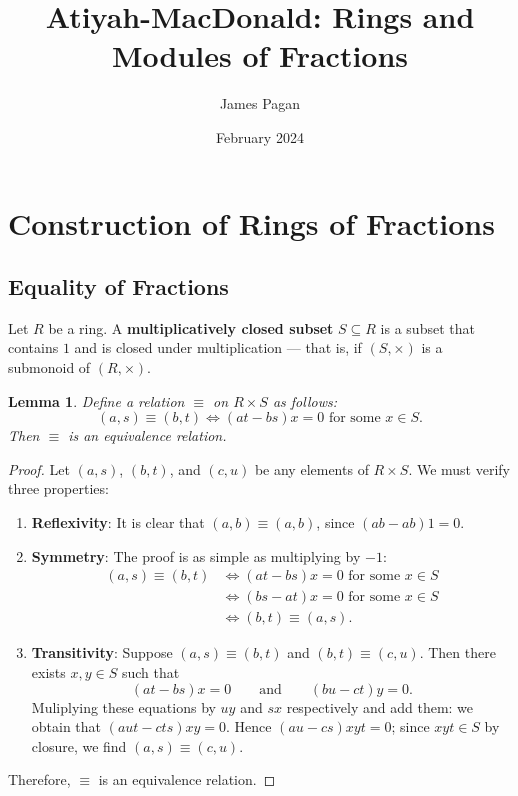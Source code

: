 \documentclass[11pt]{article}
\title{Atiyah-MacDonald: Rings and Modules of Fractions}
\author{James Pagan}
\date{February 2024}
\newtheorem{lemma}{Lemma}
\begin{document}
\maketitle
\tableofcontents
\newpage


\section{Construction of Rings of Fractions}


\subsection{Equality of Fractions}

Let $R$ be a ring. A \textbf{multiplicatively closed subset} $S \subseteq R$ is a subset that contains $1$ and is closed under multiplication --- that is, if $(S, \times)$ is a submonoid of $(R, \times)$. 

\begin{adjustwidth}{1cm}{}
  \begin{lemma}
    Define a relation $\equiv$ on $R \times S$ as follows:
    \[
      (a, s) \equiv (b, t) \iff (at - bs)x = 0 \text{ for some } x \in S.
    \]
    Then $\equiv$ is an equivalence relation.
  \end{lemma}
  \begin{proof}
    Let $(a, s)$, $(b, t)$, and $(c, u)$ be any elements of $R \times S$. We must verify three properties:
    \begin{enumerate}
      \item \textbf{Reflexivity}: It is clear that $(a, b) 
        \equiv (a, b)$, since $(ab - ab)1 = 0$.
      \item \textbf{Symmetry}: The proof is as simple as multiplying by $-1$:
      \begin{align*}
        (a, s) \equiv (b, t) &\iff (at - bs)x = 0 \text{ for some } x \in S \\
                             &\iff (bs - at)x = 0 \text{ for some } x \in S \\
                             &\iff (b, t) \equiv (a, s).
      \end{align*}
      \item \textbf{Transitivity}: Suppose $(a, s) \equiv (b, t)$ and $(b, t) \equiv (c, u)$. Then there exists $x, y \in S$ such that
      \[
        (at - bs)x = 0 \qquad \text{and} \qquad (bu - ct)y = 0.
      \]
      Muliplying these equations by $uy$ and $sx$ respectively and add them: we obtain that $(aut - cts)xy = 0$. Hence $(au - cs)xyt = 0$; since $xyt \in S$ by closure, we find $(a, s) \equiv (c, u)$. 
    \end{enumerate}
    Therefore, $\equiv$ is an equivalence relation.
  \end{proof}
\end{adjustwidth}
\end{document}
